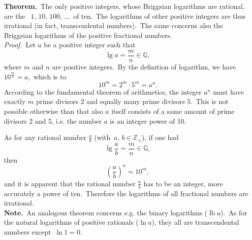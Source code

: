 \documentclass[12pt]{article}
\theoremstyle{definition}
\DeclareMathOperator{\lb}{lb}
\begin{document}
\textbf{Theorem.}\, The only positive integers, whose Briggsian logarithms are rational, are the \, $1,\,10,\,100,\,\ldots$\, of ten.\, The logarithms of other positive integers are thus irrational (in fact, transcendental numbers).\, The same concerns also the Briggsian logarithms of the positive fractional numbers.\\

{\em Proof.}\, Let $a$ be a positive integer such that
$$\lg{a} = \frac{m}{n} \in \mathbb{Q},$$
where $m$ and $n$ are positive integers.\, By the definition of logarithm, we have\, 
$\displaystyle10^{\frac{m}{n}} = a$,\, which is  to
$$10^m = 2^m\cdot 5^m = a^n.$$
According to the fundamental theorem of arithmetics, the integer $a^n$ must have exactly $m$ prime divisors $2$ and equally many prime divisors $5$.\, This is not possible otherwise than that also $a$ itself consists of a same amount of prime divisors 2 and 5, i.e. the number $a$ is an integer power of 10.

As for any rational number $\displaystyle\frac{a}{b}$ (with\, $a,\,b \in \mathbb{Z}_+$), if one had
$$\lg{\frac{a}{b}} = \frac{m}{n} \in \mathbb{Q},$$
then
$$\left(\frac{a}{b}\right)^n = 10^m,$$
and it is apparent that the rational number $\displaystyle\frac{a}{b}$ has to be an integer, more accurately a power of ten.\, Therefore the logarithms of all fractional numbers are irrational.\\



\textbf{Note.}\, An analogous theorem concerns e.g. the binary logarithms ($\lb{a}$).\, As for the natural logarithms of positive rationals ($\ln{a}$), they all are transcendental numbers except\, $\ln1 = 0$.
\end{document}
